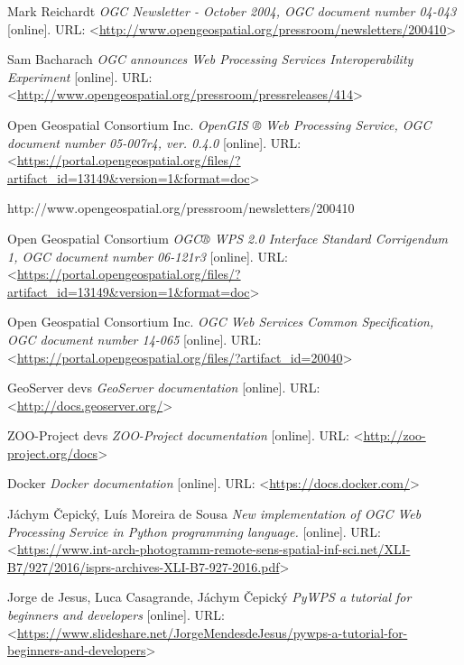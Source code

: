 \documentclass[12pt,a4paper]{article}
\begin{document}
\newpage
\begin{thebibliography}{99}
\label{Bibliography}
Mark Reichardt \textit{OGC Newsletter - October 2004, OGC document number 04-043} [online].
URL: \textless\url{http://www.opengeospatial.org/pressroom/newsletters/200410}\textgreater

Sam Bacharach \textit{OGC announces Web Processing Services Interoperability Experiment} [online].
URL: \textless\url{http://www.opengeospatial.org/pressroom/pressreleases/414}\textgreater

Open Geospatial Consortium Inc. \textit{OpenGIS ® Web Processing Service, OGC document number 05-007r4, ver. 0.4.0} [online].
URL: \textless\url{https://portal.opengeospatial.org/files/?artifact_id=13149&version=1&format=doc}\textgreater

http://www.opengeospatial.org/pressroom/newsletters/200410

Open Geospatial Consortium \textit{OGC® WPS 2.0 Interface Standard Corrigendum 1, OGC document number 06-121r3} [online].
URL: \textless\url{https://portal.opengeospatial.org/files/?artifact_id=13149&version=1&format=doc}\textgreater

Open Geospatial Consortium Inc. \textit{OGC Web Services Common Specification, OGC document number 14-065} [online].
URL: \textless\url{https://portal.opengeospatial.org/files/?artifact_id=20040}\textgreater

GeoServer devs \textit{GeoServer documentation} [online].
URL: \textless\url{http://docs.geoserver.org/}\textgreater

ZOO-Project devs \textit{ZOO-Project documentation} [online].
URL: \textless\url{http://zoo-project.org/docs}\textgreater

Docker \textit{Docker documentation} [online].
URL: \textless\url{https://docs.docker.com/}\textgreater

Jáchym Čepický, Luís Moreira de Sousa \textit{New implementation of OGC Web Processing Service in Python programming language.} [online].
URL: \textless\url{https://www.int-arch-photogramm-remote-sens-spatial-inf-sci.net/XLI-B7/927/2016/isprs-archives-XLI-B7-927-2016.pdf}\textgreater

Jorge de Jesus, Luca Casagrande, Jáchym Čepický \textit{PyWPS a tutorial for beginners and developers} [online].
URL: \textless\url{https://www.slideshare.net/JorgeMendesdeJesus/pywps-a-tutorial-for-beginners-and-developers}\textgreater


\end{thebibliography}
\end{document}
